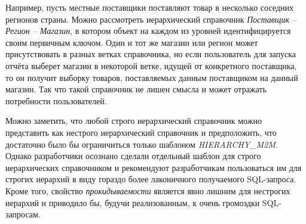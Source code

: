 \documentclass[../user-manual.tex]{subfiles}
\begin{document}
	\begin{boxed}
		Например, пусть местные поставщики поставляют товар в несколько соседних регионов страны. Можно рассмотреть иерархический справочник \textit{Поставщик -- Регион -- Магазин}, в котором объект на каждом из уровней идентифицируется своим первичным ключом. Один и тот же магазин или регион может присутствовать в разных ветках справочника, но если пользователь для запуска отчёта выберет магазин в некоторой ветке, идущей от конкретного поставщика, то он получит выборку товаров, поставляемых данным поставщиком на данный магазин. Так что такой справочник не лишен смысла и может отражать потребности пользователей.
		
		Можно заметить, что любой строго иерархический справочник можно представить как нестрого иерархический справочник и предположить, что достаточно было бы ограничиться только шаблоном \textit{HIERARCHY\_M2M}. Однако разработчики осознано сделали отдельный шаблон для строго иерархических справочником и рекомендуют разработчикам пользоваться им для строгих иерархий в виду гораздо более лаконичного получаемого SQL-запроса. Кроме того, свойство \textit{прокидываемости} является явно лишним для нестрогих иерархий и приводило бы, будучи реализованным, к очень громоздки SQL-запросам.
	\end{boxed}
\end{document}
